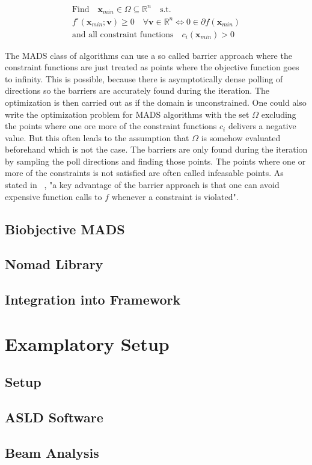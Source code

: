 \documentclass[a4paper,10pt]{article}
\renewcommand{\vec}[1]{\mathbf{#1}}
\begin{document}
    \begin{equation}
    \label{equ:optimality_mads}
        \begin{gathered}
        \text{Find} \quad \vec{x}_{min} \in \Omega \subseteq \mathbb{R}^n \quad \text{s.t.}\\
        f^{\circ}(\vec{x}_{min}; \vec{v}) \geq 0 \quad \forall
             \vec{v} \in \mathbb{R}^n
            \Longleftrightarrow
            0 \in \partial f(\vec{x}_{min})\\
        \text{and all constraint functions} \quad c_i(\vec{x}_{min}) > 0
        \end{gathered}
    \end{equation}

    The MADS class of algorithms can use a so called barrier approach where the
    constraint functions are just treated as points where the objective function
    goes to infinity.
    This is possible, because there is asymptotically dense polling of directions
    so the barriers are accurately found during the iteration.
    The optimization is then carried out as if the domain is unconstrained.
    One could also write the optimization problem for MADS algorithms with
    the set $\Omega$ excluding the points where one ore more of the constraint
    functions $c_i$ delivers a negative value.
    But this often leads to the assumption that $\Omega$ is somehow evaluated
    beforehand which is not the case.
    The barriers are only found during the iteration by sampling the poll
    directions and finding those points.
    The points where one or more of the constraints is not satisfied are often called
    infeasable points.
    As stated in ~\cite{mads_original}, "a key advantage of the barrier
    approach is that one can avoid expensive function calls to $f$ whenever
    a constraint is violated".

    \subsection{Biobjective MADS}
    \subsection{Nomad Library}
    \subsection{Integration into Framework}

    \section{Examplatory Setup} \label{sec:setup}
    \subsection{Setup} 
    \subsection{ASLD Software}
    \subsection{Beam Analysis}

    \newpage

    
    
\end{document}
